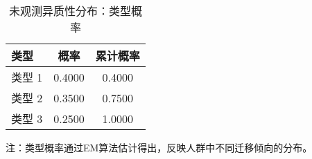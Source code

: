 \begin{table}[htbp]
\centering
\caption{未观测异质性分布：类型概率}
\label{tab:heterogeneity_results}
\begin{tabular}{lcc}
\toprule
类型 & 概率 & 累计概率 \\
\midrule
类型 1 & 0.4000 & 0.4000 \\
类型 2 & 0.3500 & 0.7500 \\
类型 3 & 0.2500 & 1.0000 \\
\bottomrule
\end{tabular}
\begin{tablenotes}
\small
\item 注：类型概率通过EM算法估计得出，反映人群中不同迁移倾向的分布。
\end{tablenotes}
\end{table}
